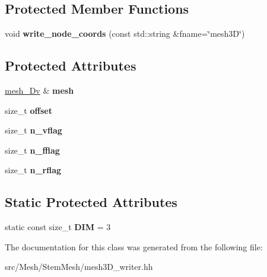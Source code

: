 \subsection*{Protected Member Functions}
\begin{DoxyCompactItemize}
\item 
\mbox{\label{classStemMesh3D_1_1mesh3Dv__writer_aa3954191960a61dd2aed64d4a1639352}} 
void {\bfseries write\+\_\+node\+\_\+coords} (const std\+::string \&fname=\char`\"{}mesh3D\char`\"{})
\end{DoxyCompactItemize}
\subsection*{Protected Attributes}
\begin{DoxyCompactItemize}
\item 
\mbox{\label{classStemMesh3D_1_1mesh3Dv__writer_afcc6928486dd97041191366ab9c35c8e}} 
\hyperlink{classStemMesh3D_1_1mesh__3Dv}{mesh\+\_\+Dv} \& {\bfseries mesh}
\item 
\mbox{\label{classStemMesh3D_1_1mesh3Dv__writer_af734b616320e49709b8797e779fe2798}} 
size\+\_\+t {\bfseries offset}
\item 
\mbox{\label{classStemMesh3D_1_1mesh3Dv__writer_aa38a6f6f2f6fc20303589aea01af02ce}} 
size\+\_\+t {\bfseries n\+\_\+vflag}
\item 
\mbox{\label{classStemMesh3D_1_1mesh3Dv__writer_a40016c367f564af223b7b5a24b265eaa}} 
size\+\_\+t {\bfseries n\+\_\+fflag}
\item 
\mbox{\label{classStemMesh3D_1_1mesh3Dv__writer_a521af78f761e436e82fcffa050bca58f}} 
size\+\_\+t {\bfseries n\+\_\+rflag}
\end{DoxyCompactItemize}
\subsection*{Static Protected Attributes}
\begin{DoxyCompactItemize}
\item 
\mbox{\label{classStemMesh3D_1_1mesh3Dv__writer_ac3a19a51146235a50852d73bb2593ff2}} 
static const size\+\_\+t {\bfseries D\+IM} = 3
\end{DoxyCompactItemize}


The documentation for this class was generated from the following file\+:\begin{DoxyCompactItemize}
\item 
src/\+Mesh/\+Stem\+Mesh/mesh3\+D\+\_\+writer.\+hh\end{DoxyCompactItemize}
